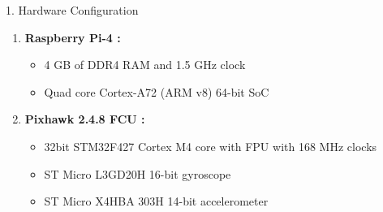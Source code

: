 \documentclass[10pt]{beamer}
\begin{document}
\begin{frame}{}
    \begin{description}
        \item[1. Hardware Configuration]
    \end{description}{}
        \begin{minipage}{0.47\textwidth}
		\begin{enumerate}
    \item \textbf{Raspberry Pi-4 : }
    \begin{itemize}
        \item 4 GB of DDR4 RAM and 1.5 GHz clock
        \item Quad core Cortex-A72 (ARM v8) 64-bit SoC
    \end{itemize}

    \item \textbf{Pixhawk 2.4.8 FCU : }
    \begin{itemize}
        \item 32bit STM32F427 Cortex M4 core with FPU with 168 MHz clocks
        \item ST Micro L3GD20H 16-bit gyroscope
        \item ST Micro X4HBA 303H 14-bit accelerometer
    \end{itemize}


\end{enumerate}
\end{minipage}
\end{frame}
\end{document}
